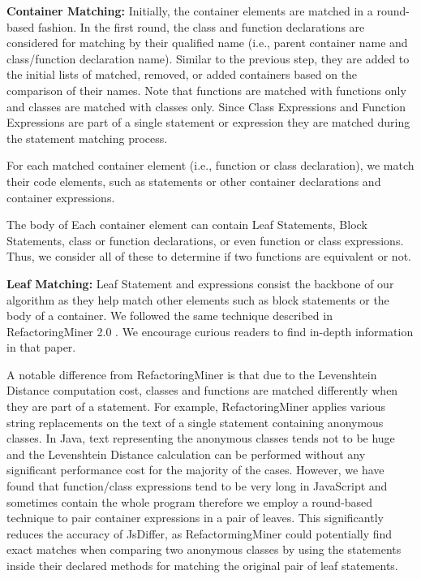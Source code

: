 \documentclass[letterpaper,12pt,onecolumn,final]{report}
\begin{document}
\textbf{Container Matching:} Initially, the container elements are matched in a round-based fashion. In the first round, the class and function declarations are considered for matching by their qualified name (i.e., parent container name and class/function declaration name). Similar to the previous step, they are added to the initial lists of matched, removed, or added containers based on the comparison of their names. Note that functions are matched with functions only and classes are matched with classes only. Since Class Expressions and Function Expressions are part of a single statement or expression they are matched during the statement matching process.

For each matched container element (i.e., function or class declaration), we match their code elements, such as statements or other container declarations and container expressions.

The body of Each container element can contain Leaf Statements, Block Statements, class or function declarations, or even function or class expressions. Thus, we consider all of these to determine if two functions are equivalent or not.

\textbf{Leaf Matching:} Leaf Statement and expressions consist the backbone of our algorithm as they help match other elements such as block statements or the body of a container. We followed the same technique described in RefactoringMiner 2.0 \cite{Tsantalis2020}. We encourage curious readers to find in-depth information in that paper.

A notable difference from RefactoringMiner is that due to the Levenshtein Distance computation cost, classes and functions are matched differently when they are part of a statement. For example, RefactoringMiner applies various string replacements on the text of a single statement containing anonymous classes. In Java, text representing the anonymous classes tends not to be huge and the Levenshtein Distance calculation can be performed without any significant performance cost for the majority of the cases. However, we have found that function/class expressions tend to be very long in JavaScript and sometimes contain the whole program therefore we employ a round-based technique to pair container expressions in a pair of leaves. This significantly reduces the accuracy of JsDiffer, as RefactormingMiner could potentially find exact matches when comparing two anonymous classes by using the statements inside their declared methods for matching the original pair of leaf statements.
\end{document}
